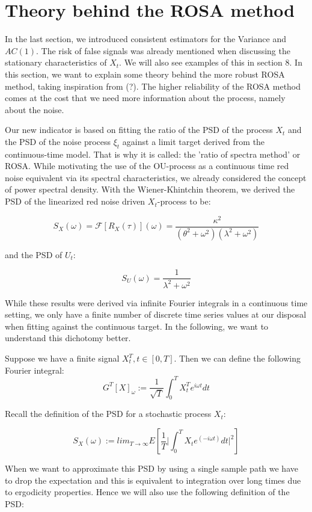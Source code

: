 \documentclass[%
thesis=student,%
coverpage=false,%
titlepage=false,%
headmarks=true, %
english,%
font=libertine, %
math=newpxtx, %
BCOR=5mm,%
coverBCOR=11mm%
]{tumbook}
\begin{document}
\chapter{Theory behind the ROSA method}

In the last section, we introduced consistent estimators for the Variance and $AC(1)$. The risk of false signals was already mentioned when discussing the stationary characteristics of $X_{t}$. We will also see examples of this in section 8. In this section, we want to explain some theory behind the more robust ROSA method, taking inspiration from (?). The higher reliability of the ROSA method comes at the cost that we need more information about the process, namely about the noise. 

Our new indicator is based on fitting the ratio of the PSD of the process $X_{t}$ and the PSD of the noise process $\xi_{t}$ against a limit target derived from the continuous-time model. That is why it is called: the 'ratio of spectra method' or ROSA. While motivating the use of the OU-process as a continuous time red noise equivalent via its spectral characteristics, we already considered the concept of power spectral density. With the Wiener-Khintchin theorem, we derived the PSD of the linearized red noise driven $X_{t}$-process to be:

\[
S_{X}(\omega) = \mathcal{F}[R_{X}(\tau)](\omega) = \frac{\kappa^{2}}{(\theta^{2} + \omega^{2})(\lambda^{2} + \omega^{2})}
\]

and the PSD of $U_{t}$:

\[
S_{U}(\omega) = \frac{1}{\lambda^2 + \omega^2}
\]

While these results were derived via infinite Fourier integrals in a continuous time setting, we only have a finite number of discrete time series values at our disposal when fitting against the continuous target. In the following, we want to understand this dichotomy better.

Suppose we have a finite signal $X_{t}^{T}, t \in [0,T]$. Then we can define the following Fourier integral: 
\[
    G^{T}[X]_{\omega} := \frac{1}{\sqrt{T}}\int_{0}^{T}X_{t}^{T}e^{i \omega t}dt
\]

Recall the definition of the PSD for a stochastic process $X_{t}$:

\[
S_{X}(\omega) := lim_{T\rightarrow\infty}E[\frac{1}{T}\lvert\int_{0}^{T}X_{t}e^{(-i\omega t)}dt \rvert^{2}]
\]

When we want to approximate this PSD by using a single sample path we have to drop the expectation and this is equivalent to integration over long times due to ergodicity properties. Hence we will also use the following definition of the PSD:
\end{document}

